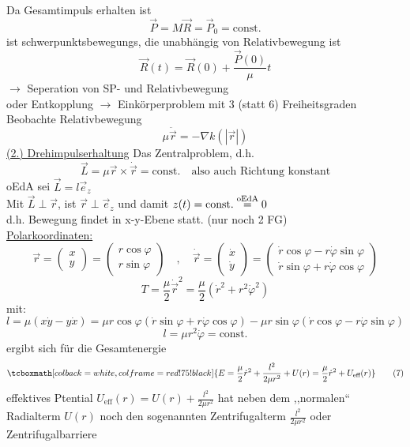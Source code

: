 \documentclass[titlepage,12pt,a4paper,ngerman]{report}
\newcommand{\tx}[1]{\textrm{#1}}
\newcommand{\rmbox}[1]{\tcboxmath[colback=white,colframe=red!75!black]{#1}} %
\renewcommand{\boxed}{\rmbox}
\begin{document}
Da Gesamtimpuls erhalten ist
$$\vec{P} = M \vec{R} = \vec{P}_0 = \tx{const.}$$
ist schwerpunktsbewegungs, die unabhängig von Relativbewegung ist
$$\vec{R}(t) = \vec{R}(0) + \frac{\vec{P}(0)}{\mu}t$$
$\rightarrow$ Seperation von SP- und Relativbewegung\\
oder Entkopplung $\rightarrow$ Einkörperproblem mit 3 (statt 6) Freiheitsgraden\\
Beobachte Relativbewegung
$$\mu \ddot{\vec{r}} = - \nabla k(|\vec{r}|)$$
\underline{(2.) Drehimpulserhaltung}
Das Zentralproblem, d.h.
$$\vec{L} = \mu \vec{r} \times \dot{\vec{r}} = \textrm{const.} \quad \tx{also auch Richtung konstant}$$
oEdA sei $\vec{L} = l \vec{e}_z$\\
Mit $\vec{L} \perp \vec{r}$, ist $\vec{r} \perp \vec{e}_z$ und damit $z(t) = \tx{const.} \buildrel \tx{oEdA} \over = 0$\\
d.h. Bewegung findet in x-y-Ebene statt. (nur noch 2 FG)\\
\underline{Polarkoordinaten:}
$$\vec{r} = \begin{pmatrix}
x\\y
\end{pmatrix} = \begin{pmatrix}
r \cos \varphi \\ r \sin \varphi
\end{pmatrix} \quad , \quad \dot{\vec{r}} = \begin{pmatrix}
\dot{x} \\ \dot{y}
\end{pmatrix} = \begin{pmatrix}
\dot{r} \cos \varphi - r \dot{\varphi} \sin \varphi \\ \dot{r} \sin \varphi + r \dot{\varphi} \cos \varphi
\end{pmatrix} $$
$$T = \frac{\mu}{2} \dot{\vec{r}}^2 = \frac{\mu}{2} ( \dot{r}^2 + r^2 \dot{\varphi}^2)$$
mit:
$$ l = \mu(x\dot{y} - y \dot{x}) = \mu r \cos \varphi ( \dot{r} \sin \varphi + r \dot{\varphi} \cos \varphi) - \mu r \sin \varphi ( \dot{r} \cos \varphi - r \dot{\varphi} \sin \varphi)$$
$$l = \mu r^2 \dot{\varphi} = \tx{const.}$$
ergibt sich für die Gesamtenergie
\begin{equation*}
\boxed{ E = \frac{\mu}{2} \dot{r}^2 + \frac{l^2}{2 \mu r^2} + U(r) = \frac{\mu}{2} \dot{r}^2 + U_{\tx{eff}}(r)} \tag{7}
\end{equation*}
effektives Ptential $ U_{\tx{eff}} (r) = U(r)  + \frac{l^2}{2 \mu r^2}$ hat neben dem ,,normalen`` Radialterm $U(r)$ noch den sogenannten Zentrifugalterm $ \frac{l^2}{2 \mu r^2} $ oder Zentrifugalbarriere\\\\
\end{document}
